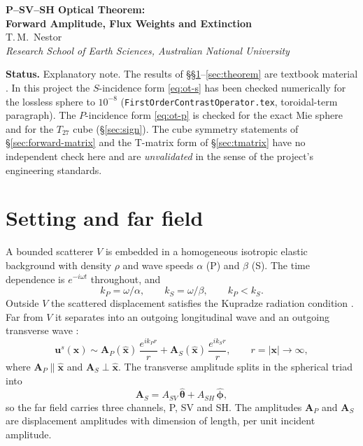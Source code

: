 \documentclass[11pt,a4paper]{article}
\newcommand{\bx}{\mathbf{x}}
\newcommand{\bu}{\mathbf{u}}
\newcommand{\bA}{\mathbf{A}}
\newcommand{\xh}{\hat{\mathbf{x}}}
\newcommand{\thh}{\hat{\boldsymbol{\theta}}}
\newcommand{\phh}{\hat{\boldsymbol{\phi}}}
\newcommand{\kp}{k_{P}}
\newcommand{\ks}{k_{S}}
\begin{document}
\thispagestyle{plain}
\begin{center}
\vspace*{1em}
{\LARGE\bfseries P--SV--SH Optical Theorem:\\[0.3em]
Forward Amplitude, Flux Weights and Extinction}\\[1.8em]
{\large T.\,M.\ Nestor}\\[0.5em]
{\itshape Research School of Earth Sciences, Australian National University}\\[2em]
\end{center}

\noindent\textbf{Status.} Explanatory note. The results of
\S\S\ref{sec:setup}--\ref{sec:theorem} are textbook material
\citep{Varatharajulu1977,PaoMow1973,Newton1982}. In this project the
$S$-incidence form \eqref{eq:ot-s} has been checked numerically for the
lossless sphere to $10^{-8}$ (\texttt{FirstOrderContrastOperator.tex},
toroidal-term paragraph). The $P$-incidence form \eqref{eq:ot-p} is
checked for the exact Mie sphere and for the $T_{27}$ cube
(\S\ref{sec:sign}). The cube symmetry statements of
\S\ref{sec:forward-matrix} and the T-matrix form of \S\ref{sec:tmatrix}
have no independent check here and are \emph{unvalidated} in the sense of
the project's engineering standards.

\section{Setting and far field}
\label{sec:setup}

A bounded scatterer $V$ is embedded in a homogeneous isotropic elastic
background with density $\rho$ and wave speeds $\alpha$ (P) and $\beta$
(S). The time dependence is $e^{-i\omega t}$ throughout, and
\begin{equation}
  \kp = \omega/\alpha, \qquad \ks = \omega/\beta, \qquad \kp < \ks .
  \label{eq:k}
\end{equation}
Outside $V$ the scattered displacement satisfies the Kupradze radiation
condition \citep{PaoVaratharajulu1976}. Far from $V$ it separates into
an outgoing longitudinal wave and an outgoing transverse wave
\citep{PaoMow1973,AkiRichards2002}:
\begin{equation}
  \bu^{s}(\bx) \sim
  \bA_P(\xh)\,\frac{e^{i\kp r}}{r}
  + \bA_S(\xh)\,\frac{e^{i\ks r}}{r},
  \qquad r = |\bx| \to \infty,
  \label{eq:farfield}
\end{equation}
where $\bA_P \parallel \xh$ and $\bA_S \perp \xh$. The transverse
amplitude splits in the spherical triad into
\begin{equation}
  \bA_S = A_{SV}\,\thh + A_{SH}\,\phh ,
  \label{eq:svsh}
\end{equation}
so the far field carries three channels, P, SV and SH. The amplitudes
$\bA_P$ and $\bA_S$ are displacement amplitudes with dimension of
length, per unit incident amplitude.
\end{document}
